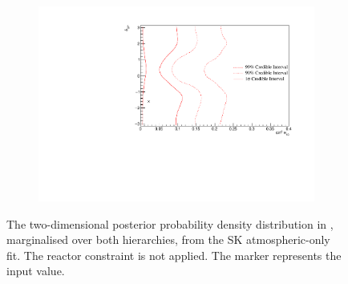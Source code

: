 \begin{figure}[h]
  \begin{subfigure}[t]{0.96\textwidth}
    \includegraphics[width=\textwidth, trim={0mm 0mm 0mm 0mm}, clip,page=1]{Figures/OA/SKOnlyFit/Contours_2D_th13_dcp_BH_0_woRC_UnSmeared_CredibleInterval.pdf}
  \end{subfigure}
  \caption{The two-dimensional posterior probability density distribution in , marginalised over both hierarchies, from the SK atmospheric-only fit. The reactor constraint is not applied. The marker represents the input value.}
  \label{fig:OscillationAnalysis_SKOnly_DCPTH13}
\end{figure}
